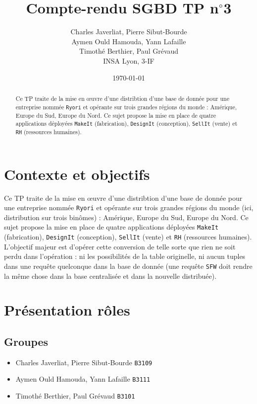\documentclass[10pt,a4paper]{article}
\title{\textbf{Compte-rendu SGBD TP n$^\circ$3}}
\author{
Charles Javerliat, Pierre Sibut-Bourde\\
Aymen Ould Hamouda, Yann Lafaille\\
Timothé Berthier, Paul Grévaud\\
\small INSA Lyon, 3-IF
}
\date{\today}
\theoremstyle{plain}
\begin{document}
\maketitle
\begin{abstract}
    Ce TP traite de la mise en \oe uvre d'une distribtion d'une base de donnée pour une entreprise nommée \verb|Ryori| et opérante sur trois grandes régions du monde : Amérique, Europe du Sud, Europe du Nord. Ce sujet propose la mise en place de quatre applications déployées \verb|MakeIt| (fabrication), \verb|DesignIt| (conception), \verb|SellIt| (vente) et \verb|RH| (ressources humaines).
\end{abstract}

\newpage
\tableofcontents
\newpage

\section{Contexte et objectifs}
Ce TP traite de la mise en \oe uvre d'une distribtion d'une base de donnée pour une entreprise nommée \verb|Ryori| et opérante sur trois grandes régions du monde (ici, distribution sur trois binômes) : Amérique, Europe du Sud, Europe du Nord. Ce sujet propose la mise en place de quatre applications déployées \verb|MakeIt| (fabrication), \verb|DesignIt| (conception), \verb|SellIt| (vente) et \verb|RH| (ressources humaines). L'objectif majeur est d'opérer cette conversion de telle sorte que rien ne soit perdu dans l'opération : ni les possibilités de la table originelle, ni aucun tuples dans une requête quelconque dans la base de donnée (une requête \verb|SFW| doit rendre la même chose dans la base centralisée et dans la nouvelle distribuée).

\section{Présentation rôles}
\subsection{Groupes}
\begin{itemize}
    \item Charles Javerliat, Pierre Sibut-Bourde \verb|B3109|
    \item Aymen Ould Hamouda, Yann Lafaille \verb|B3111|
    \item Timothé Berthier, Paul Grévaud \verb|B3101|
\end{itemize}
\end{document}
